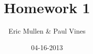 \documentclass[12pt]{article}
\begin{document}
\title{Homework 1}
\author{Eric Mullen \& Paul Vines}
\date{04-16-2013}
\maketitle
\end{document}
